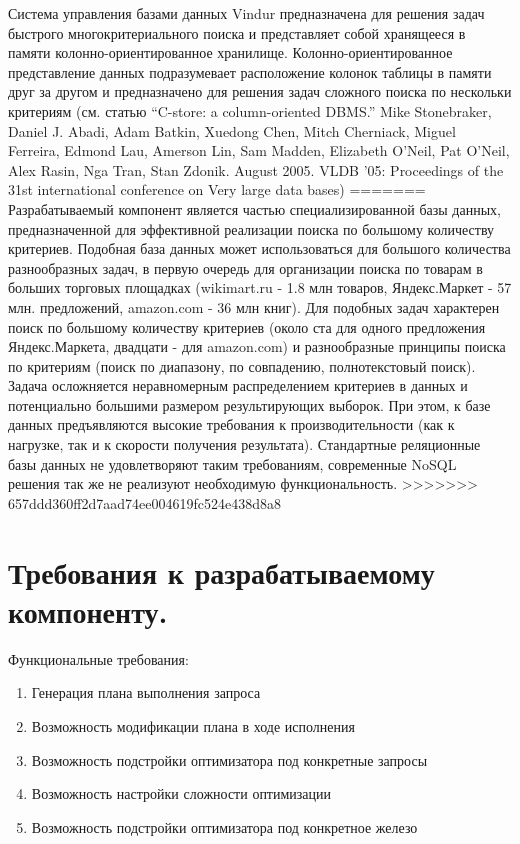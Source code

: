 \documentclass[12pt]{article}
\begin{document}
        Система управления базами данных Vindur предназначена для решения задач быстрого многокритериального поиска и представляет собой хранящееся в памяти колонно-ориентированное хранилище. Колонно-ориентированное представление данных подразумевает расположение колонок таблицы в памяти друг за другом и предназначено для решения задач сложного поиска по нескольки критериям  (см. статью ``C-store: a column-oriented DBMS.'' Mike Stonebraker, Daniel J. Abadi, Adam Batkin, Xuedong Chen, Mitch Cherniack, Miguel Ferreira, Edmond Lau, Amerson Lin, Sam Madden, Elizabeth O'Neil, Pat O'Neil, Alex Rasin, Nga Tran, Stan Zdonik. August 2005. VLDB '05: Proceedings of the 31st international conference on Very large data bases)     
=======
        Разрабатываемый компонент является частью специализированной базы данных, предназначенной для эффективной
        реализации поиска по большому количеству критериев. Подобная база данных может использоваться для большого
        количества разнообразных задач, в первую очередь для организации поиска по товарам в больших торговых
        площадках (wikimart.ru - 1.8 млн товаров, Яндекс.Маркет - 57 млн. предложений, amazon.com - 36 млн книг). Для
        подобных задач характерен поиск по большому количеству критериев (около ста для одного предложения
        Яндекс.Маркета, двадцати - для amazon.com) и разнообразные принципы поиска по критериям (поиск по диапазону,
        по совпадению, полнотекстовый поиск). Задача осложняется неравномерным распределением критериев в данных
        и потенциально большими размером результирующих выборок. При этом, к базе данных предъявляются высокие
        требования к производительности (как к нагрузке, так и к скорости получения результата). Стандартные
        реляционные базы данных не удовлетворяют таким требованиям, современные NoSQL решения так же не реализуют
        необходимую функциональность.
>>>>>>> 657ddd360ff2d7aad74ee004619fc524e438d8a8
    \section{Требования к разрабатываемому компоненту.}
        Функциональные требования:
        \begin{enumerate}\itemsep1pt \parskip0pt 
            \item Генерация плана выполнения запроса
            \item Возможность модификации плана в ходе исполнения
            \item Возможность подстройки оптимизатора под конкретные запросы
            \item Возможность настройки сложности оптимизации
            \item Возможность подстройки оптимизатора под конкретное железо
        \end{enumerate}
        
\end{document}
